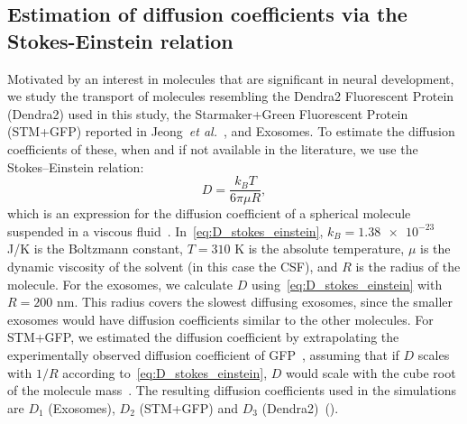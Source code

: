 \documentclass[fleqn]{wlscirep}
\begin{document}
\subsection*{Estimation of diffusion coefficients via the Stokes-Einstein relation}
Motivated by an interest in molecules that are significant in neural development,
we study the transport of molecules resembling the Dendra2 Fluorescent Protein (Dendra2)
used in this study, the Starmaker+Green Fluorescent Protein (STM+GFP) reported in
Jeong~\emph{et al.}~\cite{Jeong2024TheZebrafish}, and Exosomes.
To estimate the diffusion coefficients of these, when and if not
available in the literature, we use the Stokes--Einstein relation:
\begin{equation}
    D = \frac{k_B T}{6\pi \mu R},
    \label{eq:D_stokes_einstein}
\end{equation}
which is an expression for the diffusion coefficient of a spherical
molecule suspended in a viscous fluid~\cite{Einstein1905UberTeilchen}.
In~\eqref{eq:D_stokes_einstein}, $k_B = \num{1.38e-23}$ J/K is the Boltzmann constant,
$T = 310$ K is the absolute temperature, $\mu$ is the dynamic viscosity of the
solvent (in this case the CSF), and $R$ is the radius of the molecule.
For the exosomes, we calculate $D$ using~\eqref{eq:D_stokes_einstein}
with $R=200$ nm. This radius covers the slowest diffusing exosomes,
since the smaller exosomes would have diffusion coefficients similar to the other molecules.
For STM+GFP, we estimated the diffusion coefficient by extrapolating
the experimentally observed diffusion coefficient of
GFP~\cite{Swaminathan1997PhotobleachingDiffusion, Potma2001ReducedCells},
assuming that if $D$ scales with $1/R$ according to~\eqref{eq:D_stokes_einstein},
$D$ would scale with the cube root of the molecule mass~\cite{Goodhill1997DiffusionGuidance}.
The resulting diffusion coefficients used in the simulations
are $D_1$ (Exosomes), $D_2$ (STM+GFP) and $D_3$ (Dendra2)~().

\end{document}
